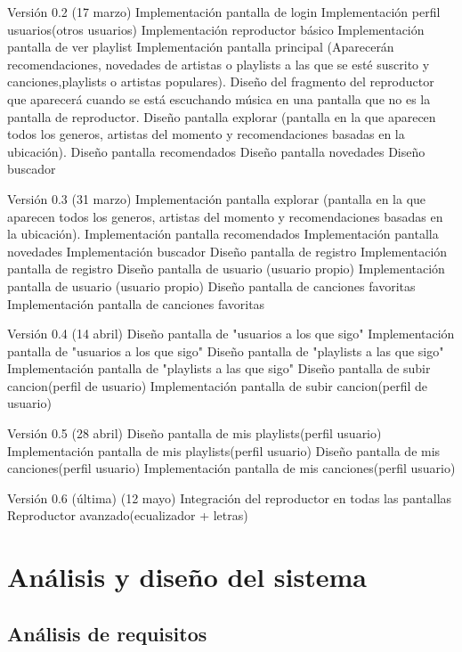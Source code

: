 \documentclass[12pt]{article}%
\begin{document}
Versi\'on 0.2 (17 marzo)
Implementaci\'on pantalla de login
Implementaci\'on perfil usuarios(otros usuarios)
Implementaci\'on reproductor b\'asico
Implementaci\'on pantalla de ver playlist
Implementaci\'on pantalla principal (Aparecer\'an recomendaciones, novedades de artistas o playlists a las que se est\'e suscrito y canciones,playlists o artistas populares).
Diseño del fragmento del reproductor que aparecer\'a cuando se est\'a escuchando m\'usica en una pantalla que no es la pantalla de reproductor.
Diseño pantalla explorar (pantalla en la que aparecen todos los generos, artistas del momento y recomendaciones basadas en la ubicaci\'on).
Diseño pantalla recomendados
Diseño pantalla novedades
Diseño buscador

Versi\'on 0.3 (31 marzo)
Implementaci\'on pantalla explorar (pantalla en la que aparecen todos los generos, artistas del momento y recomendaciones basadas en la ubicaci\'on).
Implementaci\'on pantalla recomendados
Implementaci\'on pantalla novedades
Implementaci\'on buscador
Diseño pantalla de registro
Implementaci\'on pantalla de registro
Diseño pantalla de usuario (usuario propio)
Implementaci\'on pantalla de usuario (usuario propio)
Diseño pantalla de canciones favoritas
Implementaci\'on pantalla de canciones favoritas

Versi\'on 0.4 (14 abril)
Diseño pantalla de "usuarios a los que sigo"
Implementaci\'on pantalla de "usuarios a los que sigo"
Diseño pantalla de "playlists a las que sigo"
Implementaci\'on pantalla de "playlists a las que sigo"
Diseño pantalla de subir cancion(perfil de usuario)
Implementaci\'on pantalla de subir cancion(perfil de usuario)

Versi\'on 0.5 (28 abril)
Diseño pantalla de mis playlists(perfil usuario)
Implementaci\'on pantalla de mis playlists(perfil usuario)
Diseño pantalla de mis canciones(perfil usuario)
Implementaci\'on pantalla de mis canciones(perfil usuario)

Versi\'on 0.6 (\'ultima) (12 mayo)
Integraci\'on del reproductor en todas las pantallas
Reproductor avanzado(ecualizador + letras)



\section{An\'alisis y dise\~no del sistema} %

\subsection{An\'alisis de requisitos}
\end{document}

